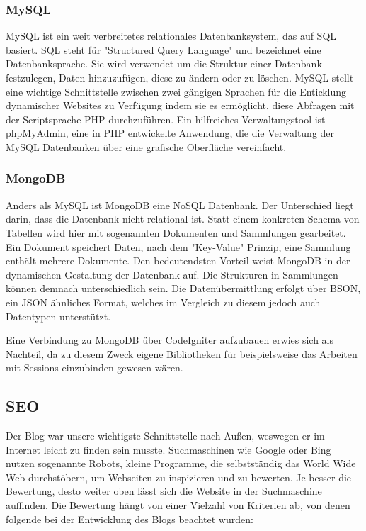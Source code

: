 {        \subsubsection*{MySQL}
        MySQL ist ein weit verbreitetes relationales Datenbanksystem, das auf SQL basiert. SQL steht für "Structured Query Language" und bezeichnet eine Datenbanksprache.
        Sie wird verwendet um die Struktur einer Datenbank festzulegen, Daten hinzuzufügen, diese zu ändern oder zu löschen. MySQL stellt eine wichtige Schnittstelle zwischen zwei gängigen Sprachen für
        die Enticklung dynamischer Websites zu Verfügung indem sie es ermöglicht, diese Abfragen mit der Scriptsprache PHP durchzuführen. Ein hilfreiches Verwaltungstool ist phpMyAdmin,
        eine in PHP entwickelte Anwendung, die die Verwaltung der MySQL Datenbanken über eine grafische Oberfläche vereinfacht.

        \subsubsection*{MongoDB}
        Anders als MySQL ist {MongoDB\cite{mongodb}} eine NoSQL Datenbank. Der Unterschied liegt darin, dass die Datenbank nicht relational ist. Statt einem konkreten Schema von Tabellen
        wird hier mit sogenannten Dokumenten und Sammlungen gearbeitet. Ein Dokument speichert Daten, nach dem "Key-Value" Prinzip, eine Sammlung enthält mehrere Dokumente.
        Den bedeutendsten Vorteil weist MongoDB in der dynamischen Gestaltung der Datenbank auf. Die Strukturen in Sammlungen können demnach unterschiedlich sein. Die
        Datenübermittlung erfolgt über {BSON\cite{bson}}, ein JSON ähnliches Format, welches im Vergleich zu diesem jedoch auch Datentypen unterstützt.

        Eine Verbindung zu MongoDB über CodeIgniter aufzubauen erwies sich als Nachteil, da zu diesem Zweck eigene Bibliotheken für beispielsweise das Arbeiten mit Sessions
        einzubinden gewesen wären.

    \subsection*{SEO}
    Der Blog war unsere wichtigste Schnittstelle nach Außen, weswegen er im Internet leicht zu finden sein musste. Suchmaschinen wie Google oder Bing nutzen
    sogenannte Robots, kleine Programme, die selbstständig das World Wide Web durchstöbern, um Webseiten zu inspizieren und zu bewerten. Je besser die Bewertung,
    desto weiter oben lässt sich die Website in der Suchmaschine auffinden.
    Die Bewertung hängt von einer Vielzahl von Kriterien ab, von denen folgende bei der Entwicklung des Blogs beachtet wurden:

}
